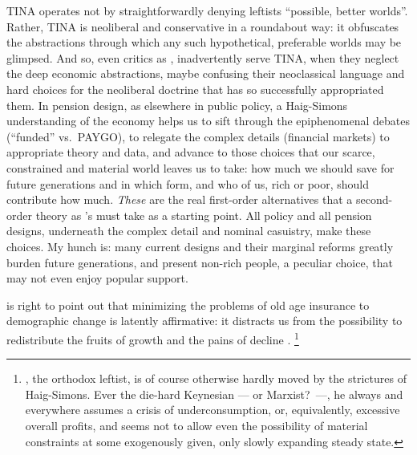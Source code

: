 TINA operates not by straightforwardly denying leftists ``possible, better worlds''.
Rather, TINA is neoliberal and conservative in a roundabout way:
it obfuscates the abstractions through which any such hypothetical, preferable worlds may be glimpsed.
And so, even critics as \citeauthor{Cerami2009a}, inadvertently serve TINA, when they neglect the deep economic abstractions, maybe confusing their neoclassical language and hard choices for the neoliberal doctrine that has so successfully appropriated them.
In pension design, as elsewhere in public policy, a Haig-Simons understanding of the economy helps us to sift through the epiphenomenal debates (``funded'' vs.\ PAYGO), to relegate the complex details (financial markets) to appropriate theory and data, and advance to those choices that our scarce, constrained and material world leaves us to take:
how much we should save for future generations and in which form, and who of us, rich or poor, should contribute how much.
\emph{These} are the real first-order alternatives that a second-order theory as \citeauthor{Cerami2009a}'s must take as a starting point.
All policy and all pension designs, underneath the complex detail and nominal casuistry, make these choices.
My hunch is:
many  current designs and their marginal reforms greatly burden future generations, and present non-rich people, a peculiar choice, that may not even enjoy popular support.

\citeauthor{Schui2009} is right to point out that minimizing the problems of old age insurance to demographic change is latently affirmative:
it distracts us from the possibility to redistribute the fruits of growth and the pains of decline \citeyearpar[147]{Schui2009}.
\footnote{
	\citeauthor{Schui2009}, the orthodox leftist, is of course otherwise hardly moved by the strictures of Haig-Simons.
	Ever the die-hard Keynesian --- or Marxist?\ ---, he always and everywhere assumes a crisis of underconsumption, or, equivalently, excessive overall profits, and seems not to allow even the possibility of material constraints at some exogenously given, only slowly expanding steady state.
}


